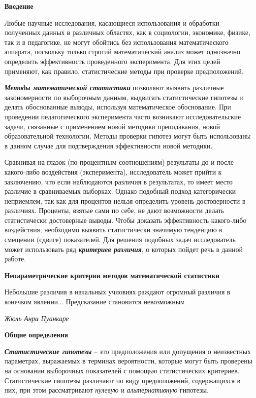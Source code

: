 \documentclass[12pt]{article}
\date{}
\begin{document}
\textbf{Введение}

Любые научные исследования, касающиеся использования и обработки полученных данных в различных областях, как в социологии, экономике, физике, так и в педагогике, не могут обойтись без использования математического аппарата, поскольку только строгий математический анализ может однозначно определить эффективность проведенного эксперимента. Для этих целей применяют, как правило, статистические методы при проверке предположений.

\textbf{\textit{Методы математической статистики}} позволяют выявить различные закономерности по выборочным данным, выдвигать статистические гипотезы и делать обоснованные выводы, используя математическое обоснование. При проведении педагогического эксперимента часто возникают исследовательские задачи, связанные с применением новой методики преподавания, новой образовательной технологии. Методы проверки гипотез могут быть использованы в данном случае для подтверждения эффективности новой методики.

Сравнивая на глазок (по процентным соотношениям) результаты до и после какого-либо воздействия (эксперимента), исследователь может прийти к заключению, что если наблюдаются различия в результатах, то имеет место различие в сравниваемых выборках. Однако подобный подход категорически неприемлем, так как для процентов нельзя определить уровень достоверности в различиях. Проценты, взятые сами по себе, не дают возможности делать статистически достоверные выводы. Чтобы доказать эффективность какого-либо воздействия, необходимо выявить статистически значимую тенденцию в смещении (сдвиге) показателей. Для решения подобных задач исследователь может использовать ряд \textbf{\textit{критериев различия}}, о которых пойдет речь в данной работе.

\medskip
\textbf{Непараметрические критерии методов математической статистики}

\epigraph{Небольшие различия в начальных учловиях раждают огромный различия в конечком явлении... Предсказание становится невозможным}{\textit{Жюль Анри Пуанкаре}}

\textbf{Общие определения}

\medskip
\textbf{\textit{Статистические гипотезы}} – это предположения или допущения о неизвестных параметрах, выражаемых в терминах вероятности, которые могут быть проверены на основании выборочных показателей с помощью статистических критериев.
Статистические гипотезы различают по виду предположений, содержащихся в них, при этом рассматривают \textit{нулевую} и \textit{альтернативную} гипотезы.
\end{document}
